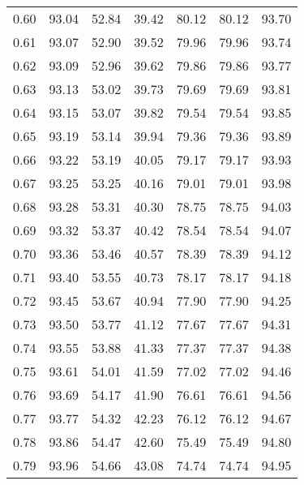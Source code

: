 \begin{tabular}{|c|c|c|c|c|c|c|}
      0.60 &     93.04 &     52.84 &      39.42 &   80.12 &      80.12 &         93.70 \\
      0.61 &     93.07 &     52.90 &      39.52 &   79.96 &      79.96 &         93.74 \\
      0.62 &     93.09 &     52.96 &      39.62 &   79.86 &      79.86 &         93.77 \\
      0.63 &     93.13 &     53.02 &      39.73 &   79.69 &      79.69 &         93.81 \\
      0.64 &     93.15 &     53.07 &      39.82 &   79.54 &      79.54 &         93.85 \\
      0.65 &     93.19 &     53.14 &      39.94 &   79.36 &      79.36 &         93.89 \\
      0.66 &     93.22 &     53.19 &      40.05 &   79.17 &      79.17 &         93.93 \\
      0.67 &     93.25 &     53.25 &      40.16 &   79.01 &      79.01 &         93.98 \\
      0.68 &     93.28 &     53.31 &      40.30 &   78.75 &      78.75 &         94.03 \\
      0.69 &     93.32 &     53.37 &      40.42 &   78.54 &      78.54 &         94.07 \\
      0.70 &     93.36 &     53.46 &      40.57 &   78.39 &      78.39 &         94.12 \\
      0.71 &     93.40 &     53.55 &      40.73 &   78.17 &      78.17 &         94.18 \\
      0.72 &     93.45 &     53.67 &      40.94 &   77.90 &      77.90 &         94.25 \\
      0.73 &     93.50 &     53.77 &      41.12 &   77.67 &      77.67 &         94.31 \\
      0.74 &     93.55 &     53.88 &      41.33 &   77.37 &      77.37 &         94.38 \\
      0.75 &     93.61 &     54.01 &      41.59 &   77.02 &      77.02 &         94.46 \\
      0.76 &     93.69 &     54.17 &      41.90 &   76.61 &      76.61 &         94.56 \\
      0.77 &     93.77 &     54.32 &      42.23 &   76.12 &      76.12 &         94.67 \\
      0.78 &     93.86 &     54.47 &      42.60 &   75.49 &      75.49 &         94.80 \\
      0.79 &     93.96 &     54.66 &      43.08 &   74.74 &      74.74 &         94.95 \\

\end{tabular}
